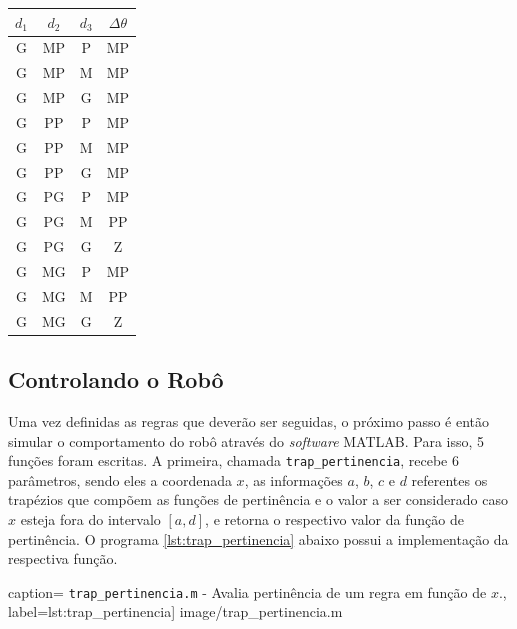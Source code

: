 \begin{table}[H]
\begin{minipage}{0.30\textwidth}
\begin{tabular}{| c | c | c | c |}
						\end{tabular}	
					\end{minipage}	
					\begin{minipage}{0.30\textwidth}
					    \centering
						\begin{tabular}{| c | c | c | c |} 
						\hline
						\(d_1\) & \(d_2\) & \(d_3\) & \(\Delta \theta\) \\ \hline
						G & MP & P & MP \\ \hline
						G & MP & M & MP \\ \hline
						G & MP & G & MP \\ \hline
						G & PP & P & MP \\ \hline
						G & PP & M & MP \\ \hline
						G & PP & G & MP  \\ \hline 	  	 
						G & PG & P & MP \\ \hline
						G & PG & M & PP \\ \hline
						G & PG & G & Z  \\ \hline
						G & MG & P & MP \\ \hline
						G & MG & M & PP \\ \hline
						G & MG & G & Z  \\ \hline
						\end{tabular}	
					\end{minipage}	      
			    \end{table}
	\FloatBarrier
	
	\subsection{Controlando o Robô}
	
	Uma vez definidas as regras que deverão ser seguidas, o próximo passo é então
	simular o comportamento do robô através do \textit{software} MATLAB. Para isso,
	5 funções foram escritas. A primeira, chamada \texttt{trap\_pertinencia},
	recebe 6 parâmetros, sendo eles a coordenada \(x\), as informações \(a\), \(b\), \(c\)
	e \(d\) referentes os trapézios que compõem as funções de pertinência e o valor
	a ser considerado caso \(x\) esteja fora do intervalo \(\left[a, d\right]\), e
	retorna o respectivo valor da função de pertinência. O programa
	\ref{lst:trap_pertinencia} abaixo possui a implementação da respectiva
	função.
	
	 caption={ \texttt{trap\_pertinencia.m} -
	Avalia pertinência de um regra em função de \(x\).},
	label={lst:trap_pertinencia}] {image/trap_pertinencia.m}
	
